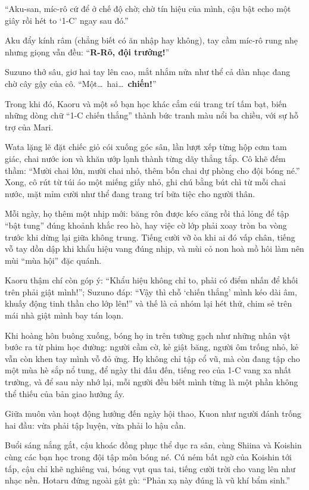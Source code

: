 \documentclass[../main.tex]{subfiles}
\begin{document}
``Aku-san, míc-rô cứ để ở chế độ chờ; chờ tín hiệu của mình, cậu bật echo một giây rồi hét to `1-C' ngay sau đó.''

Aku đẩy kính râm (chẳng biết có ăn nhập hay không), tay cầm míc-rô rung nhẹ nhưng giọng vẫn đều: ``\textbf{R-Rõ, đội trưởng!}''

Suzuno thở sâu, giơ hai tay lên cao, mắt nhắm nửa như thể cả dàn nhạc đang chờ cây gậy của cô. ``Một\dots\ hai\dots\ \textbf{chiến!}''

Trong khi đó, Kaoru và một số bạn học khác cắm cúi trang trí tấm bạt, biến những dòng chữ ``1-C chiến thắng'' thành bức tranh màu nổi ba chiều, với sự hỗ trợ của Mari.

Wata lặng lẽ đặt chiếc giỏ cói xuống góc sân, lần lượt xếp từng hộp cơm tam giác, chai nước ion và khăn ướp lạnh thành từng dãy thẳng tắp. Cô khẽ đếm thầm: ``Mười chai lớn, mười chai nhỏ, thêm bốn chai dự phòng cho đội bóng né.'' Xong, cô rút từ túi áo một miếng giấy nhỏ, ghi chú bằng bút chì từ mỗi chai nước, mặt mỉm cười như thể đang trang trí bữa tiệc cho người thân.

Mỗi ngày, họ thêm một nhịp mới: băng rôn được kéo căng rồi thả lỏng để tập ``bật tung'' đúng khoảnh khắc reo hò, hay việc cờ lớp phải xoay tròn ba vòng trước khi dừng lại giữa không trung. Tiếng cười vỡ òa khi ai đó vấp chân, tiếng vỗ tay dồn dập khi khẩu hiệu vang đúng nhịp, và mùi cỏ non hoà mồ hôi làm nên mùi ``mùa hội'' đặc quánh.

Kaoru thậm chí còn góp ý: ``Khẩu hiệu không chỉ to, phải có điểm nhấn để khối trên phải giật mình!''; Suzuno đáp: ``Vậy thì chỗ `chiến thắng' mình kéo dài âm, khuấy động tinh thần cho lớp lên!'' và thế là cả nhóm lại hét thử, chim sẻ trên mái nhà giật mình bay tán loạn.

Khi hoàng hôn buông xuống, bóng họ in trên tường gạch như những nhân vật bước ra từ phim học đường: người cầm cờ, kẻ giật băng, người ôm trống nhỏ, kẻ vẫn còn khen tay mình vỗ đỏ ửng. Họ không chỉ tập cổ vũ, mà còn đang tập cho một mùa hè sắp nổ tung, để ngày thi đấu đến, tiếng reo của 1-C vang xa nhất trường, và để sau này nhớ lại, mỗi người đều biết mình từng là một phần không thể thiếu của bản giao hưởng ấy.

Giữa muôn vàn hoạt động hướng đến ngày hội thao, Kuon như người đánh trống hai đầu: vừa phải tập luyện, vừa phải lo hậu cần.

Buổi sáng nắng gắt, cậu khoác đồng phục thể dục ra sân, cùng Shiina và Koishin cùng các bạn học trong đội tập môn bóng né. Cú ném bất ngờ của Koishin tới tấp, cậu chỉ khẽ nghiêng vai, bóng vụt qua tai, tiếng cười trời cho vang lên như nhạc nền. Hotaru đứng ngoài gật gù: ``Phản xạ này đúng là vũ khí bẩm sinh.''
\end{document}
